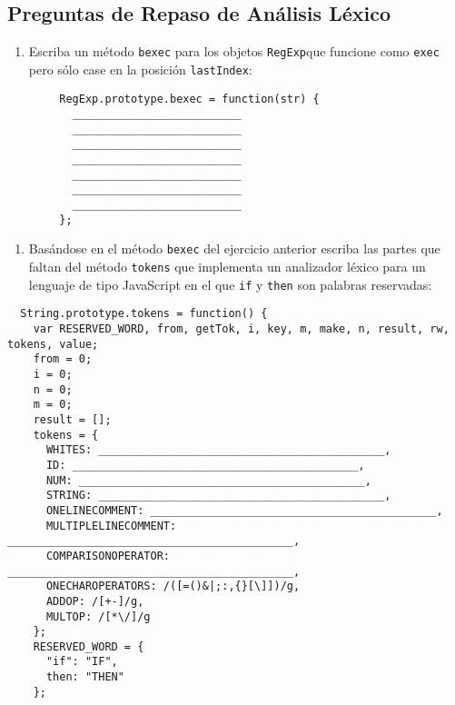 \subsection{Preguntas de Repaso de Análisis
Léxico}\label{preguntas-de-repaso-de-anuxe1lisis-luxe9xico}

\begin{enumerate}
\def\labelenumi{\arabic{enumi}.}
\itemsep1pt\parskip0pt
\item
  Escriba un método \texttt{bexec} para los objetos \texttt{RegExp}que
  funcione como \texttt{exec} pero sólo case en la posición
  \texttt{lastIndex}:
\end{enumerate}

\begin{verbatim}
        RegExp.prototype.bexec = function(str) {
          __________________________
          __________________________
          __________________________
          __________________________
          __________________________
          __________________________
          __________________________
        };
\end{verbatim}

\begin{enumerate}
\def\labelenumi{\arabic{enumi}.}
\setcounter{enumi}{1}
\itemsep1pt\parskip0pt
\item
  Basándose en el método \texttt{bexec} del ejercicio anterior escriba
  las partes que faltan del método \texttt{tokens} que implementa un
  analizador léxico para un lenguaje de tipo JavaScript en el que
  \texttt{if} y \texttt{then} son palabras reservadas:
\end{enumerate}

\begin{verbatim}
  String.prototype.tokens = function() {
    var RESERVED_WORD, from, getTok, i, key, m, make, n, result, rw, tokens, value;
    from = 0;
    i = 0;
    n = 0;
    m = 0;
    result = [];
    tokens = {
      WHITES: ____________________________________________,
      ID: ____________________________________________,
      NUM: ____________________________________________,
      STRING: ____________________________________________,
      ONELINECOMMENT: ____________________________________________,
      MULTIPLELINECOMMENT: ____________________________________________,
      COMPARISONOPERATOR: ____________________________________________,
      ONECHAROPERATORS: /([=()&|;:,{}[\]])/g,
      ADDOP: /[+-]/g,
      MULTOP: /[*\/]/g
    };
    RESERVED_WORD = {
      "if": "IF",
      then: "THEN"
    };
\end{verbatim}

